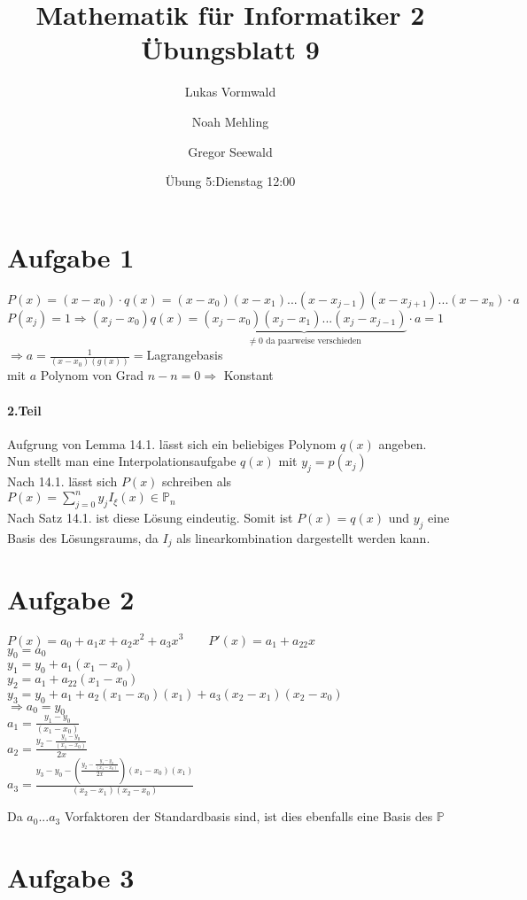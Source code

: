 \documentclass[11pt,a4paper]{article}
\title{Mathematik für Informatiker 2\\Übungsblatt 9}
\author{Lukas Vormwald \and Noah Mehling \and Gregor Seewald}
\date{Übung 5:Dienstag 12:00}
\newcommand{\Aufgabe}[1]{\section*{Aufgabe #1}}
\begin{document}
\maketitle

  \Aufgabe{1}
    $P(x)=(x-x_0)\cdot q(x)=(x-x_0)(x-x_1)...(x-x_{j-1})(x-x_{j+1})...(x-x_n)\cdot a$\\
    $P(x_j)=1\Rightarrow(x_j-x_0)q(x)=\underbrace{(x_j-x_0)(x_j-x_1)...(x_j-x_{j-1})}_{\neq 0 \text{ da paarweise verschieden}}\cdot a=1$\\
    $\Rightarrow a=\frac{1}{(x-x_0)(g(x))}=$Lagrangebasis\\
    mit $a$ Polynom von Grad $n-n=0\Rightarrow$ Konstant
    \paragraph{2.Teil}
    Aufgrung von Lemma 14.1. lässt sich ein beliebiges Polynom $q(x)$ angeben.\\
    Nun stellt man eine Interpolationsaufgabe $q(x)$ mit $y_j=p(x_j)$\\
    Nach 14.1. lässt sich $P(x)$ schreiben als\\
    $P(x)=\sum\limits_{j=0}^{n}y_jI_\xi(x)\in\mathbb{P}_n$\\
    Nach Satz 14.1. ist diese Lösung eindeutig. Somit ist $P(x)=q(x)$ und $y_j$ eine Basis des Lösungsraums, da $I_j$ als linearkombination dargestellt werden kann.

    \newpage

  \Aufgabe{2}
    $P(x)=a_0+a_1x+a_2x^2+a_3x^3\qquad P'(x)=a_1+a_22x$\\
    $y_0=a_0$\\
    $y_1=y_0+a_1(x_1-x_0)$\\
    $y_2=a_1+a_22(x_1-x_0)$\\
    $y_3=y_0+a_1+a_2(x_1-x_0)(x_1)+a_3(x_2-x_1)(x_2-x_0)$\\
    $\Rightarrow a_0=y_0$\\
    $a_1=\frac{y_1-y_0}{(x_1-x_0)}$\\
    $a_2=\frac{y_2-\frac{y_1-y_0}{(x_1-x_0)}}{2x}$\\
    $a_3=\frac{y_3-y_0-\left(\frac{y_2-\frac{y_1-y_0}{(x_1-x_0)}}{2x}\right)(x_1-x_0)(x_1)}{(x_2-x_1)(x_2-x_0)}$

    Da $a_0 ... a_3$ Vorfaktoren der Standardbasis sind, ist dies ebenfalls eine Basis des $\mathbb{P}$

    \newpage

    \Aufgabe{3}
\end{document}
